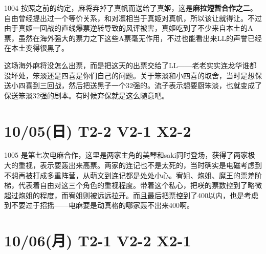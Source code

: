 1004 按照之前的约定，麻将弃掉了真帆而送给了真姬，这是\textbf{麻拉短暂合作之二}。自由曾经提出过一个等价关系，和对凛相当于真姬对真帆，所以该让就得让。不过由于真姬一回战的直线爆票逆转导致的风评被害，真姬吃到了不少来自本土的A票，虽然在海外强大的票力之下这些A票毫无作用，不过也能看出来LL的声誉已经在本土变得很黑了。

这场海外麻将没怎么出票，而是把这天的出票交给了LL——老老实实连龙华谁都没坏处，笨淡还是四喜是你们自己的问题。关于笨淡和小四喜的取舍，当时是想保送小四喜到三回战，然后把送黑子一个32强的。流子表示想要厨笨淡，也就变成了保送笨淡32强的剧本。有时候弃保就是这么随意吧。

\section{10/05(日) T2-2 V2-1 X2-2}


1005 是第七次电麻合作，这里是两家主角的美琴和saki同时登场，获得了两家极大的重视，表示要轰出来高票。两家的连记也不是太死的，当时确实是电磁考虑到不想再被打成多重阵营，从萌文到连记都是处处小心。宥姐、炮姐、魔王的票差阶梯，代表着自由对这三个角色的重视程度。带着这个私心，把咲的票数控到了略微超过炮姐的程度，而宥姐则被远远拉开。而且最后把票控到了400以内，也是考虑到不要过于招摇——电麻要是动真格的哪家轰不出来400啊。

\section{10/06(月) T2-1 V2-2 X2-1}


